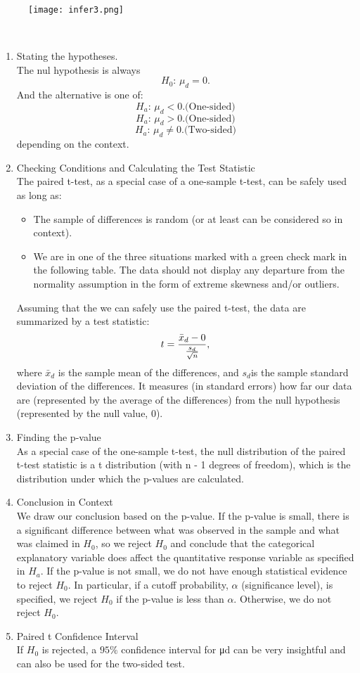 \documentclass[10pt, a4paper]{article}
\begin{document}
\begin{figure}
[h!]
\centering
\texttt{[image: infer3.png]}
\end{figure}\\
\begin{enumerate}
\item Stating the hypotheses. \\
The nul hypothesis is always
\[
H_0:\, \mu_d = 0.
\]
And the alternative is one of:
\[
    H_a: \, \mu_d < 0. \text{(One-sided)}
\]
\[
    H_a: \, \mu_d > 0. \text{(One-sided)}
\]
\[
    H_a: \, \mu_d \neq 0. \text{(Two-sided)}
\]
depending on the context.
\item Checking Conditions and Calculating the Test Statistic\\
The paired t-test, as a special case of a one-sample t-test, can be safely used as long as:
\begin{itemize}
\item  The sample of differences is random (or at least can be considered so in context).
\item We are in one of the three situations marked with a green check mark in the following table. The data should not display any departure from the normality assumption in the form of extreme skewness and/or outliers.
\end{itemize}
Assuming that the we can safely use the paired t-test, the data are summarized by a test statistic:
\[
t = \frac{\bar{x}_d - 0}{{s_d \over \sqrt{n}}},
\]
where $\bar{x}_d$ is the sample mean of the differences, and $s_d$is the sample standard deviation of the differences. It measures (in standard errors) how far our data are (represented by the average of the differences) from the null hypothesis (represented by the null value, 0).
\item Finding the p-value\\
As a special case of the one-sample t-test, the null distribution of the paired t-test statistic is a t distribution (with n - 1 degrees of freedom), which is the distribution under which the p-values are calculated. 
\item Conclusion in Context \\
We draw our conclusion based on the p-value. If the p-value is small, there is a significant difference between what was observed in the sample and what was claimed in $H_0$, so we reject $H_0$ and conclude that the categorical explanatory variable does affect the quantitative response variable as specified in $H_a$. If the p-value is not small, we do not have enough statistical evidence to reject $H_0$. In particular, if a cutoff probability, $\alpha$ (significance level), is specified, we reject $H_0$ if the p-value is less than $\alpha$. Otherwise, we do not reject $H_0$.
\item Paired t Confidence Interval\\
If $H_0$ is rejected, a $95\%$ confidence interval for μd can be very insightful and can also be used for the two-sided test.
\end{enumerate}
\end{document}
